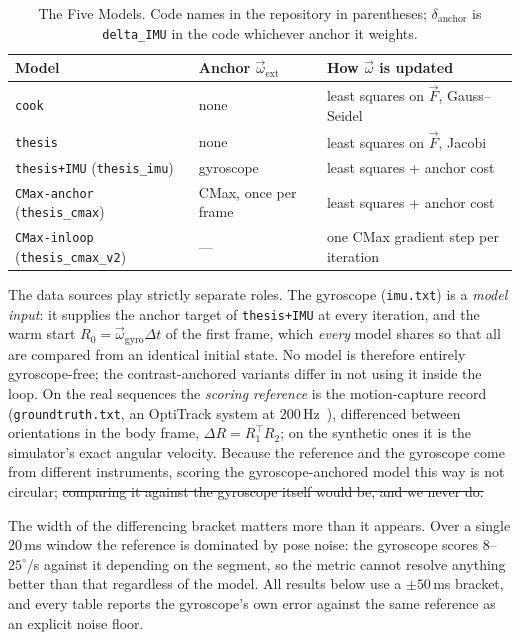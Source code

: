 \documentclass[journal]{IEEEtran}
\newcommand{\Fmap}{\vec{F}}
\newcommand{\wvec}{\vec{\omega}}
\begin{document}
\begin{table}[!t]
\renewcommand{\arraystretch}{1.2}
\caption{The Five Models. \textnormal{Code names in the repository in
parentheses; $\delta_{\text{anchor}}$ is \texttt{delta\_IMU} in the code
whichever anchor it weights.}}
\label{tab:models}
\centering
\footnotesize
\begin{tabular}{@{}>{\raggedright\arraybackslash}p{}
>{\raggedright\arraybackslash}p{}
>{\raggedright\arraybackslash}p{}@{}}
\toprule
Model & Anchor $\wvec_{\text{ext}}$ & How $\wvec$ is updated \\
\midrule
\texttt{cook} & none & least squares on $\Fmap$, Gauss--Seidel \\
\texttt{thesis} & none & least squares on $\Fmap$, Jacobi \\
\texttt{thesis+IMU} (\texttt{thesis\_imu}) & gyroscope & least squares + anchor cost \\
\texttt{CMax-anchor} (\texttt{thesis\_cmax}) & CMax, once per frame & least squares + anchor cost \\
\texttt{CMax-inloop} (\texttt{thesis\_cmax\_v2}) & --- & one CMax gradient step per iteration \\
\bottomrule
\end{tabular}
\end{table}

The data sources play strictly separate roles. The gyroscope (\texttt{imu.txt})
is a \emph{model input}: it supplies the anchor target of \texttt{thesis+IMU} at
every iteration, and the warm start $R_0 = \wvec_{\text{gyro}}\Delta t$ of the
first frame, which \emph{every} model shares so that all are compared from an
identical initial state. No model is therefore entirely gyroscope-free; the
contrast-anchored variants differ in not using it inside the loop. On the real
sequences the \emph{scoring reference} is the motion-capture record
(\texttt{groundtruth.txt}, an OptiTrack system at $200$\,Hz~\cite{mueggler2017}),
differenced between orientations in the body frame,
$\Delta R = R_1^{\!\top}R_2$; on the synthetic ones it is the simulator's exact
angular velocity. Because the reference and the gyroscope come from different
instruments, scoring the gyroscope-anchored model this way is not circular;
\st{comparing it against the gyroscope itself would be, and we never do.}

The width of the differencing bracket matters more than it appears. Over a
single 20\,ms window the reference is dominated by pose noise: the gyroscope
scores $8$--$25^\circ$/s against it depending on the segment, so the metric
cannot resolve anything better than that regardless of the model. All results
below use a $\pm50$\,ms bracket, and every table reports the gyroscope's own
error against the same reference as an explicit noise floor.
\end{document}
